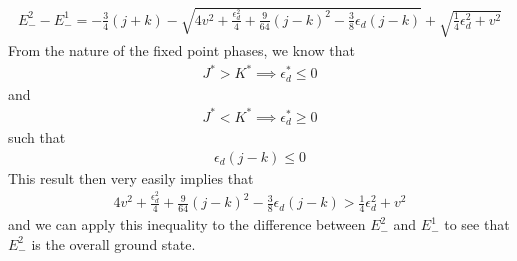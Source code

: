 \documentclass[12pt,twoside]{article}
\numberwithin{equation}{section}
\begin{document}
\begin{equation}\begin{aligned}
	E_-^2 - E_-^1= - \frac{3}{4}\left( j + k \right) - \sqrt{4v^2 + \frac{\epsilon_d^2}{4} + \frac{9}{64}\left( j - k \right) ^2 - \frac{3}{8}\epsilon_d\left( j-k \right) } + \sqrt{ \frac{1}{4}\epsilon_d^2 + v^2}
\end{aligned}\end{equation}
From the nature of the fixed point phases, we know that 
\begin{equation}\begin{aligned}
	J^* > K^* \implies \epsilon_d^* \leq 0
\end{aligned}\end{equation}
and
\begin{equation}\begin{aligned}
	J^* < K^* \implies \epsilon_d^* \geq 0
\end{aligned}\end{equation}
such that
\begin{equation}\begin{aligned}
	\epsilon_d\left( j-k \right) \leq 0
\end{aligned}\end{equation}
This result then very easily implies that
\begin{equation}\begin{aligned}
	4v^2 + \frac{\epsilon_d^2}{4} + \frac{9}{64}\left( j - k \right) ^2 - \frac{3}{8}\epsilon_d\left( j-k \right) > \frac{1}{4}\epsilon_d^2 + v^2
\end{aligned}\end{equation}
and we can apply this inequality to the difference between \(E_-^2\) and \(E_-^1\) to see that \(E_-^2\) is the overall ground state.
\end{document}
